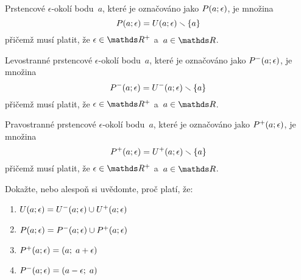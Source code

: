 \begin{definition}
    Prstencové $\epsilon$-okolí bodu~$a$, které je označováno jako
    ${P(a; \epsilon)}$, je množina
    \begin{equation*}
        P(a; \epsilon) = U(a; \epsilon) \smallsetminus \{ a \}
    \end{equation*}
    přičemž musí platit, že ${\epsilon \in \reals^{+}}$ a~${a \in \reals}$.
\end{definition}

\begin{definition}
    Levostranné prstencové $\epsilon$-okolí bodu~$a$, které je označováno jako 
    ${{P}^{-}(a; \epsilon)}$, je množina
    \begin{equation*}
        {P}^{-}(a; \epsilon) = {U}^{-}(a; \epsilon) \smallsetminus \{ a \}
    \end{equation*}
    přičemž musí platit, že ${\epsilon \in \reals^{+}}$ a~${a \in \reals}$.
\end{definition}

\begin{definition}
    Pravostranné prstencové $\epsilon$-okolí bodu~$a$, které je označováno jako 
    ${{P}^{+}(a; \epsilon)}$, je množina
    \begin{equation*}
        {P}^{+}(a; \epsilon) = {U}^{+}(a; \epsilon) \smallsetminus \{ a \}
    \end{equation*}
    přičemž musí platit, že ${\epsilon \in \reals^{+}}$ a~${a \in \reals}$.
\end{definition}

\begin{exercise}
    Dokažte, nebo alespoň si uvědomte, proč platí, že:
    \begin{enumerate}[label=(\alph*)]
        \item $U(a; \epsilon) = {U}^{-}(a; \epsilon) \cup {U}^{+}(a; \epsilon)$
        \item $P(a; \epsilon) = {P}^{-}(a; \epsilon) \cup {P}^{+}(a; \epsilon)$
        \item ${P}^{+}(a; \epsilon) = (a;\; a + \epsilon)$
        \item ${P}^{-}(a; \epsilon) = (a - \epsilon;\; a)$
    \end{enumerate}
\end{exercise}

